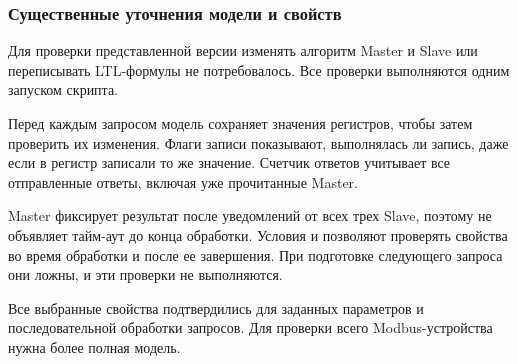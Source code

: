 \subsubsection{Существенные уточнения модели и свойств}

Для проверки представленной версии изменять алгоритм Master и Slave
или переписывать LTL-формулы не потребовалось. Все проверки выполняются
одним запуском скрипта.

Перед каждым запросом модель сохраняет значения регистров, чтобы затем
проверить их изменения. Флаги записи показывают, выполнялась ли запись,
даже если в регистр записали то же значение. Счетчик ответов учитывает
все отправленные ответы, включая уже прочитанные Master.

Master фиксирует результат после уведомлений от всех трех Slave,
поэтому не объявляет тайм-аут до конца обработки.
Условия  и  позволяют проверять свойства
во время обработки и после ее завершения. При подготовке следующего
запроса они ложны, и эти проверки не выполняются.

Все выбранные свойства подтвердились для заданных параметров
и последовательной обработки запросов. Для проверки всего
Modbus-устройства нужна более полная модель.
